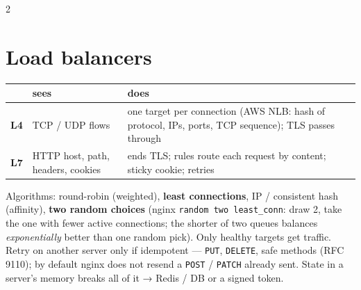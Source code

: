 \documentclass[8pt]{extarticle}
\newcommand\ct[1]{\texttt{#1}}
\begin{document}
\begin{multicols}{2}
\raggedright
\footnotesize{}

\section{Load balancers}
{\scriptsize\setlength{\tabcolsep}{3pt}
\begin{tabular}{@{}>{\raggedright\arraybackslash}p{5mm}>{\raggedright\arraybackslash}p{19mm}>{\raggedright\arraybackslash}p{50mm}@{}}
\toprule
& \textbf{sees} & \textbf{does}\\
\midrule
\textbf{L4} & TCP / UDP flows & one target per connection (AWS NLB: hash of protocol, IPs, ports, TCP sequence); TLS passes through\\
\textbf{L7} & HTTP host, path, headers, cookies & ends TLS; rules route each request by content; sticky cookie; retries\\
\bottomrule
\end{tabular}}\par
Algorithms: round-robin (weighted), \textbf{least connections}, IP / consistent hash (affinity),
\textbf{two random choices} (nginx \ct{random two least\_conn}: draw 2, take the one with fewer
active connections; the shorter of two queues balances \emph{exponentially} better than one random
pick). Only healthy targets get traffic. Retry on another server only if idempotent — \ct{PUT},
\ct{DELETE}, safe methods (RFC 9110); by default nginx does not resend a \ct{POST} / \ct{PATCH}
already sent. State in a server's memory breaks all of it → Redis / DB or a signed token.


\end{multicols}
\end{document}
